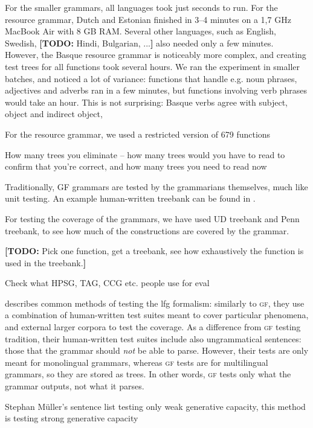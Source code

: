 \documentclass[11pt]{article}
\def\gf{\textsc{gf}}
\newcommand{\todo}[1]{{\color{cyan}\textbf{[TODO: }#1\textbf{]}}}
\begin{document}
For the smaller grammars, all languages took just
seconds to run. For the resource grammar, Dutch and Estonian finished in
3--4 minutes on a 1,7 GHz MacBook Air with 8 GB RAM. Several other
languages, such as English, Swedish, \todo{Hindi, Bulgarian, ...} also
needed only a few minutes. However, the Basque resource grammar is
noticeably more complex, and creating test trees for all functions
took several hours. We ran the experiment in smaller batches, and
noticed a lot of variance: functions that handle e.g. noun phrases,
adjectives and adverbs ran in a few minutes, but functions involving
verb phrases would take an hour. This is not surprising: Basque verbs
agree with subject, object and indirect object,

For the resource grammar, we used a restricted version of 679 functions

How many trees you eliminate -- how many trees would you have to read
to confirm that you're correct, and how many trees you need to read
now

Traditionally, GF grammars are tested by the grammarians themselves,
much like unit testing. An example human-written treebank can be found
in \cite[p.~136--142]{khegai2006phd}.

For testing the coverage of the grammars, we have used UD treebank
\cite{nivre2016ud} and Penn treebank, to see how much of the
constructions are covered by the grammar.

\todo{Pick one function, get a treebank, see how exhaustively the function
is used in the treebank.}

Check what HPSG, TAG, CCG etc. people use for eval

\cite[pp.~212--213]{butt1999lfg} describes common methods of testing the
{\sc lfg} formalism: similarly to \gf, they use a combination of
human-written test suites meant to cover particular phenomena, and
external larger corpora to test the coverage. As a difference from \gf{}
testing tradition, their human-written test suites include also
ungrammatical sentences: those that the grammar should \emph{not} be
able to parse. However, their tests are only meant for monolingual
grammars, whereas \gf{} tests are for multilingual grammars, so they are
stored as trees. In other words, \gf{} tests only what the grammar
outputs, not what it parses.

Stephan Müller's sentence list testing only weak generative capacity,
this method is testing strong generative capacity
\end{document}
